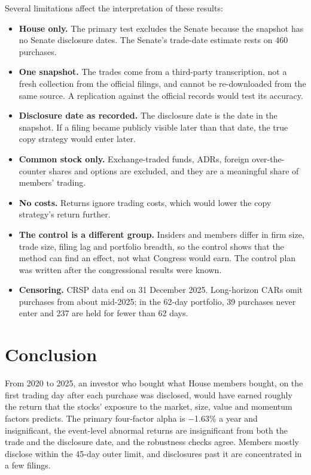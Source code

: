 \documentclass[11pt]{article}
\newcommand{\m}{\ensuremath{-}}
\begin{document}
Several limitations affect the interpretation of these results:
\begin{itemize}
\item \textbf{House only.} The primary test excludes the Senate because the snapshot has no Senate disclosure dates. The Senate's trade-date estimate rests on 460 purchases.
\item \textbf{One snapshot.} The trades come from a third-party transcription, not a fresh collection from the official filings, and cannot be re-downloaded from the same source. A replication against the official records would test its accuracy.
\item \textbf{Disclosure date as recorded.} The disclosure date is the date in the snapshot. If a filing became publicly visible later than that date, the true copy strategy would enter later.
\item \textbf{Common stock only.} Exchange-traded funds, ADRs, foreign over-the-counter shares and options are excluded, and they are a meaningful share of members' trading.
\item \textbf{No costs.} Returns ignore trading costs, which would lower the copy strategy's return further.
\item \textbf{The control is a different group.} Insiders and members differ in firm size, trade size, filing lag and portfolio breadth, so the control shows that the method can find an effect, not what Congress would earn. The control plan was written after the congressional results were known.
\item \textbf{Censoring.} CRSP data end on 31 December 2025. Long-horizon CARs omit purchases from about mid-2025; in the 62-day portfolio, 39 purchases never enter and 237 are held for fewer than 62 days.
\end{itemize}

\section{Conclusion}

From 2020 to 2025, an investor who bought what House members bought, on the first trading day after each purchase was disclosed, would have earned roughly the return that the stocks' exposure to the market, size, value and momentum factors predicts. The primary four-factor alpha is \m1.63\% a year and insignificant, the event-level abnormal returns are insignificant from both the trade and the disclosure date, and the robustness checks agree. Members mostly disclose within the 45-day outer limit, and disclosures past it are concentrated in a few filings.
\end{document}
